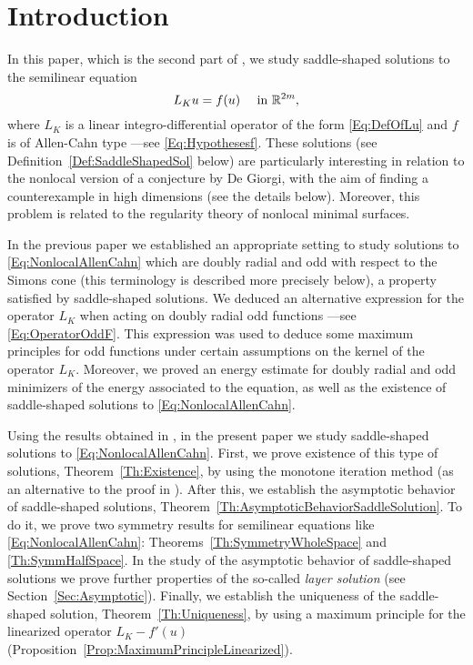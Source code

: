 \section{Introduction}
\label{Sec:Introduction}
 
In this paper, which is the second part of \cite{FelipeSanz-Perela:IntegroDifferentialI}, we study saddle-shaped solutions to the semilinear equation
\begin{equation}
\label{Eq:NonlocalAllenCahn}
L_K u = f(u) \quad \textrm{ in } \mathbb{R}^{2m},
\end{equation}
where $L_K$ is a linear integro-differential operator of the form \eqref{Eq:DefOfLu} and $f$ is of Allen-Cahn type ---see \eqref{Eq:Hypothesesf}. These  solutions (see Definition~\ref{Def:SaddleShapedSol} below) are particularly interesting in relation to the nonlocal version of a conjecture by De Giorgi, with the aim of finding a counterexample in high dimensions (see the details below). Moreover, this problem is related to the regularity theory of nonlocal minimal surfaces.

In the previous paper \cite{FelipeSanz-Perela:IntegroDifferentialI} we established an appropriate setting to study solutions to \eqref{Eq:NonlocalAllenCahn} which are doubly radial and odd with respect to the Simons cone (this terminology is described more precisely below), a property satisfied by saddle-shaped solutions. We deduced an alternative expression for the operator $L_K$ when acting on doubly radial odd functions ---see \eqref{Eq:OperatorOddF}. This expression was used to deduce some maximum principles for odd functions under certain assumptions on the kernel of the operator $L_K$. Moreover, we proved an energy estimate for doubly radial and odd minimizers of the energy associated to the equation, as well as the existence of saddle-shaped solutions to \eqref{Eq:NonlocalAllenCahn}.

Using the results obtained in \cite{FelipeSanz-Perela:IntegroDifferentialI}, in the present paper we study saddle-shaped solutions to \eqref{Eq:NonlocalAllenCahn}. First, we prove existence of this type of solutions, Theorem~\ref{Th:Existence}, by using the monotone iteration method (as an alternative to the proof in \cite{FelipeSanz-Perela:IntegroDifferentialI}). After this, we establish the asymptotic behavior of saddle-shaped solutions,  Theorem~\ref{Th:AsymptoticBehaviorSaddleSolution}. To do it, we prove two symmetry results for semilinear equations like \eqref{Eq:NonlocalAllenCahn}: Theorems~\ref{Th:SymmetryWholeSpace} and \ref{Th:SymmHalfSpace}. In the study of the asymptotic behavior of saddle-shaped solutions we prove further properties of the so-called \emph{layer solution} (see Section~\ref{Sec:Asymptotic}). Finally, we establish the uniqueness of the saddle-shaped solution, Theorem~\ref{Th:Uniqueness}, by using a maximum principle for the linearized operator $L_K - f'(u)$ (Proposition~\ref{Prop:MaximumPrincipleLinearized}).


